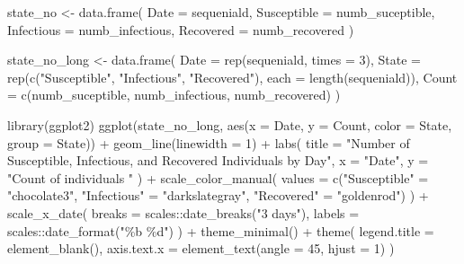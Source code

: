 \documentclass[
  letterpaper,
  DIV=11,
  numbers=noendperiod]{scrartcl}
\newenvironment{Shaded}{\begin{snugshade}}{\end{snugshade}}
\newcommand{\AttributeTok}[1]{\textcolor[rgb]{0.40,0.45,0.13}{#1}}
\newcommand{\DecValTok}[1]{\textcolor[rgb]{0.68,0.00,0.00}{#1}}
\newcommand{\FunctionTok}[1]{\textcolor[rgb]{0.28,0.35,0.67}{#1}}
\newcommand{\NormalTok}[1]{\textcolor[rgb]{0.00,0.23,0.31}{#1}}
\newcommand{\OtherTok}[1]{\textcolor[rgb]{0.00,0.23,0.31}{#1}}
\newcommand{\SpecialCharTok}[1]{\textcolor[rgb]{0.37,0.37,0.37}{#1}}
\newcommand{\StringTok}[1]{\textcolor[rgb]{0.13,0.47,0.30}{#1}}
\begin{document}
\begin{Shaded}
\begin{Highlighting}[]
\NormalTok{state\_no }\OtherTok{\textless{}{-}} \FunctionTok{data.frame}\NormalTok{(}
  \AttributeTok{Date =}\NormalTok{ sequeniald,}
  \AttributeTok{Susceptible =}\NormalTok{ numb\_suceptible,}
  \AttributeTok{Infectious =}\NormalTok{ numb\_infectious,}
  \AttributeTok{Recovered =}\NormalTok{ numb\_recovered}
\NormalTok{)}

\NormalTok{state\_no\_long }\OtherTok{\textless{}{-}} \FunctionTok{data.frame}\NormalTok{(}
  \AttributeTok{Date =} \FunctionTok{rep}\NormalTok{(sequeniald, }\AttributeTok{times =} \DecValTok{3}\NormalTok{),}
  \AttributeTok{State =} \FunctionTok{rep}\NormalTok{(}\FunctionTok{c}\NormalTok{(}\StringTok{"Susceptible"}\NormalTok{, }\StringTok{"Infectious"}\NormalTok{, }\StringTok{"Recovered"}\NormalTok{), }\AttributeTok{each =} \FunctionTok{length}\NormalTok{(sequeniald)),}
  \AttributeTok{Count =} \FunctionTok{c}\NormalTok{(numb\_suceptible, numb\_infectious, numb\_recovered)}
\NormalTok{)}

\FunctionTok{library}\NormalTok{(ggplot2)}
\FunctionTok{ggplot}\NormalTok{(state\_no\_long, }\FunctionTok{aes}\NormalTok{(}\AttributeTok{x =}\NormalTok{ Date, }\AttributeTok{y =}\NormalTok{ Count, }\AttributeTok{color =}\NormalTok{ State, }\AttributeTok{group =}\NormalTok{ State)) }\SpecialCharTok{+}
  \FunctionTok{geom\_line}\NormalTok{(}\AttributeTok{linewidth =} \DecValTok{1}\NormalTok{) }\SpecialCharTok{+}
  \FunctionTok{labs}\NormalTok{(}
    \AttributeTok{title =} \StringTok{"Number of Susceptible, Infectious, and Recovered Individuals by Day"}\NormalTok{,}
    \AttributeTok{x =} \StringTok{"Date"}\NormalTok{, }\AttributeTok{y =} \StringTok{"Count of individuals "}
\NormalTok{  ) }\SpecialCharTok{+}
  \FunctionTok{scale\_color\_manual}\NormalTok{(}
    \AttributeTok{values =} \FunctionTok{c}\NormalTok{(}\StringTok{"Susceptible"} \OtherTok{=} \StringTok{"chocolate3"}\NormalTok{, }\StringTok{"Infectious"} \OtherTok{=} \StringTok{"darkslategray"}\NormalTok{, }\StringTok{"Recovered"} \OtherTok{=} \StringTok{"goldenrod"}\NormalTok{)}
\NormalTok{  ) }\SpecialCharTok{+}
  \FunctionTok{scale\_x\_date}\NormalTok{(}
    \AttributeTok{breaks =}\NormalTok{ scales}\SpecialCharTok{::}\FunctionTok{date\_breaks}\NormalTok{(}\StringTok{"3 days"}\NormalTok{),}
    \AttributeTok{labels =}\NormalTok{ scales}\SpecialCharTok{::}\FunctionTok{date\_format}\NormalTok{(}\StringTok{"\%b \%d"}\NormalTok{)}
\NormalTok{  ) }\SpecialCharTok{+}
  \FunctionTok{theme\_minimal}\NormalTok{() }\SpecialCharTok{+}
  \FunctionTok{theme}\NormalTok{(}
    \AttributeTok{legend.title =} \FunctionTok{element\_blank}\NormalTok{(),}
    \AttributeTok{axis.text.x =} \FunctionTok{element\_text}\NormalTok{(}\AttributeTok{angle =} \DecValTok{45}\NormalTok{, }\AttributeTok{hjust =} \DecValTok{1}\NormalTok{)}
\NormalTok{  )}
\end{Highlighting}
\end{Shaded}
\end{document}
